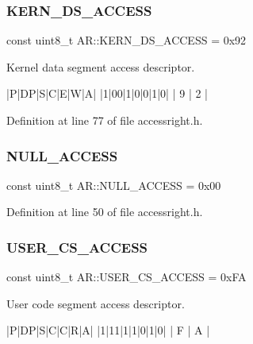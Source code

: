 \subsubsection{\texorpdfstring{K\+E\+R\+N\+\_\+\+D\+S\+\_\+\+A\+C\+C\+E\+SS}{KERN\_DS\_ACCESS}}
{\footnotesize\ttfamily const uint8\+\_\+t A\+R\+::\+K\+E\+R\+N\+\_\+\+D\+S\+\_\+\+A\+C\+C\+E\+SS = 0x92}



Kernel data segment access descriptor. 

\begin{DoxyVerb}|P|DP|S|C|E|W|A|
|1|00|1|0|0|1|0|
|   9  |   2   |
\end{DoxyVerb}
 

Definition at line 77 of file accessright.\+h.

\mbox{\label{namespace_a_r_a5441c70c25fc8a59482c6b49eb5263fd}} 
\subsubsection{\texorpdfstring{N\+U\+L\+L\+\_\+\+A\+C\+C\+E\+SS}{NULL\_ACCESS}}
{\footnotesize\ttfamily const uint8\+\_\+t A\+R\+::\+N\+U\+L\+L\+\_\+\+A\+C\+C\+E\+SS = 0x00}



Definition at line 50 of file accessright.\+h.

\mbox{\label{namespace_a_r_af35b80337e742e9605c8b3a863889545}} 
\subsubsection{\texorpdfstring{U\+S\+E\+R\+\_\+\+C\+S\+\_\+\+A\+C\+C\+E\+SS}{USER\_CS\_ACCESS}}
{\footnotesize\ttfamily const uint8\+\_\+t A\+R\+::\+U\+S\+E\+R\+\_\+\+C\+S\+\_\+\+A\+C\+C\+E\+SS = 0x\+FA}



User code segment access descriptor. 

\begin{DoxyVerb}|P|DP|S|C|C|R|A|
|1|11|1|1|0|1|0|
|   F  |   A   |
\end{DoxyVerb}
 

